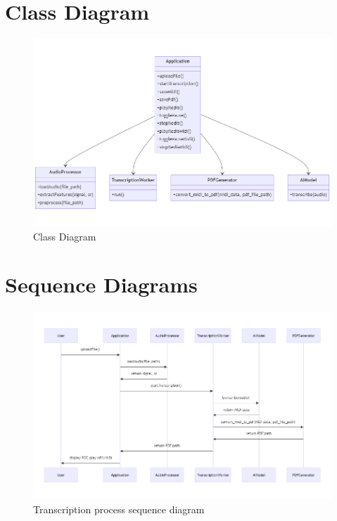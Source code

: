 \documentclass{article}
\begin{document}
\FloatBarrier
\clearpage

\section{Class Diagram}
\begin{figure}[htbp]
    \centering
    \includegraphics[width=\textwidth]{../diagrams/class_diagram.png}
    \caption{Class Diagram}
    \label{fig:class_diagram}
\end{figure}

\FloatBarrier
\clearpage

\section{Sequence Diagrams}

\begin{figure}[htbp]
    \centering
    \includegraphics[width=\textwidth]{../diagrams/transcription_seq.png}
    \caption{Transcription process sequence diagram}
    \label{fig:transcription_sequence_diagram}
\end{figure}
\end{document}
